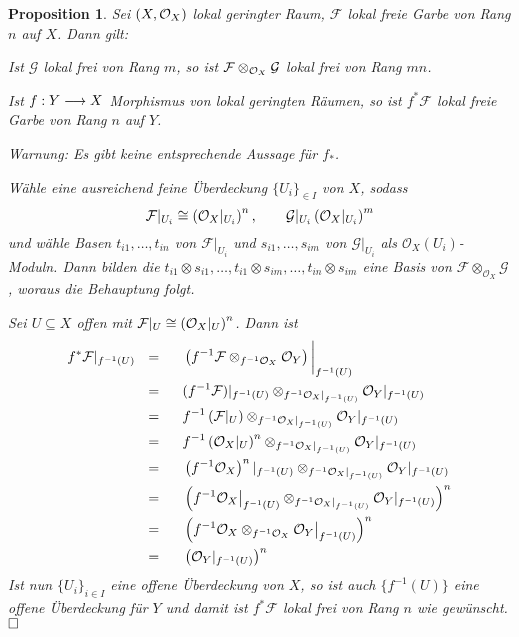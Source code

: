 \documentclass[11pt]{book}
\newtheorem{proposition}[theorem]{Proposition}
\theoremstyle{nonumberbreak}
\newenvironment{pr}[1][]{\ifthenelse{\equal{#1}{}}{\proof}{\proof[#1]}\rm}{\endproof}
\begin{document}
\begin{spacing}{1.4}
\begin{proposition}
Sei $(X, \mathcal{O}_X)$ lokal geringter Raum, $\mathcal{F}$ lokal freie Garbe  von Rang $n$ auf $X$. Dann gilt:
\begin{compactenum}
\item Ist $\mathcal{G}$ lokal frei von Rang $m$, so ist $\mathcal{F} \otimes_{\mathcal{O}_X} \mathcal{G}$ lokal frei von Rang $mn$.
\item Ist $f:Y \longrightarrow X$ Morphismus von lokal geringten Räumen, so ist $f^*\mathcal{F}$ lokal freie Garbe von Rang $n$ auf $Y$.
\end{compactenum}
\textit{Warnung}: Es gibt keine entsprechende Aussage für $f_*$.
\begin{pr}
\begin{compactenum}
\item Wähle eine ausreichend feine Überdeckung $\{U_i\}_{ \in I}$ von $X$, sodass 
$$\mathcal{F} \vert_{U_i} \cong \left( \mathcal{O}_X \vert_{U_i} \right)^n, \qquad \mathcal{G}\vert_{U_i} \left( \mathcal{O}_X\vert_{U_i} \right)^m$$
und wähle Basen $t_{i1}, \ldots, t_{in}$ von $\mathcal{F}\vert_{U_i}$ und $s_{i1}, \ldots, s_{im}$ von $\mathcal{G}\vert_{U_i}$ als $\mathcal{O}_X(U_i)$-Moduln. Dann bilden die $t_{i1} \otimes s_{i1}, \ldots, t_{i1} \otimes s_{im}, \ldots, t_{in} \otimes s_{im}$ eine Basis von $\mathcal{F} \otimes_{\mathcal{O}_X} \mathcal{G}$, woraus die Behauptung folgt.
\item Sei $U \subseteq X$ offen mit $\mathcal{F} \vert_U \cong \left( \mathcal{O}_X\vert_U\right)^n$. Dann ist
\setlength{\abovedisplayskip}{5.5pt}
\setlength{\belowdisplayskip}{5.5pt}
\begin{alignat*}{5}
f^*\mathcal{F} \vert_{f^{-1}(U)} \ \ &=&& \ \ \left( f^{-1}\mathcal{F} \otimes_{f^{-1}\mathcal{O}_X} \mathcal{O}_Y\right)\bigg\vert_{f^{-1}(U)}\\
&=&& \ \ (f^{-1}\mathcal{F}) \vert_{f^{-1}(U)} \otimes_{f^{-1}\mathcal{O}_X \vert_{f^{-1}(U)}} \mathcal{O}_Y \vert_{f^{-1}(U)} \\
&=&& \ \ f^{-1}\left(\mathcal{F}\vert_U\right) \otimes_{f^{-1}\mathcal{O}_X \vert_{f^{-1}(U)}} \mathcal{O}_Y \vert_{f^{-1}(U)} \\
&=&& \ \ f^{-1} \left(\oxg \vert_U\right)^n \otimes_{f^{-1}\mathcal{O}_X \vert_{f^{-1}(U)}} \mathcal{O}_Y \vert_{f^{-1}(U)} \\
&=&& \ \ \left( f^{-1} \mathcal{O}_X\right)^n \vert_{f^{-1}(U)} \otimes_{f^{-1}\mathcal{O}_X \vert_{f^{-1}(U)}} \mathcal{O}_Y \vert_{f^{-1}(U)} \\
&=&& \ \ \left( f^{-1} \mathcal{O}_X \big\vert_{f^{-1}(U)} \otimes_{f^{-1}\mathcal{O}_X \vert_{f^{-1}(U)}} \mathcal{O}_Y \vert_{f^{-1}(U)} \right)^n \\
&=&& \ \ \left( f^{-1} \mathcal{O}_X  \otimes_{f^{-1}\mathcal{O}_X } \mathcal{O}_Y   \big\vert_{f^{-1}(U)}\right)^n\\
&=&& \ \ \left( \mathcal{O}_Y\vert_{f^{-1}(U)}\right)^n
\end{alignat*}
Ist nun $\{U_i\}_{i\in I}$ eine offene Überdeckung von $X$, so ist auch $\{f^{-1}(U)\}$ eine offene Überdeckung für $Y$ und damit ist $f^*\mathcal{F}$ lokal frei von Rang $n$ wie gewünscht. $\hfill \Box$


\end{compactenum}
\end{pr}
\end{proposition}
\end{spacing}
\end{document}
